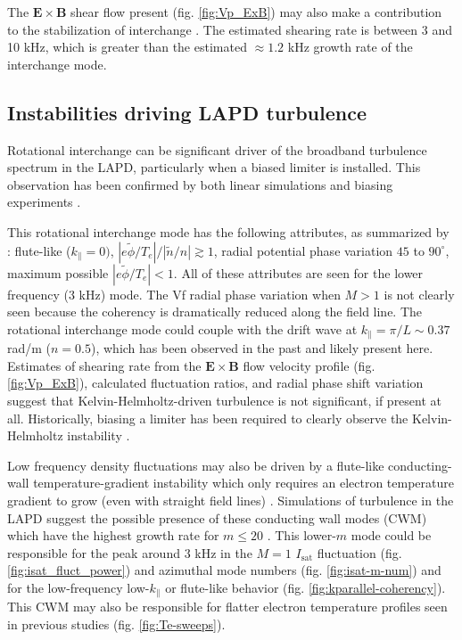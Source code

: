 The $\boldsymbol{E \times B}$ shear flow present (fig. \ref{fig:Vp_ExB}) may also make a contribution to the stabilization of interchange \cite{Ryutov_2011,Bagryansky_2003,Bagryansky_2007,Beklemishev_2010}. The estimated shearing rate is between 3 and 10 kHz, which is greater than the estimated $\approx 1.2$ kHz growth rate of the interchange mode.

\subsection{Instabilities driving LAPD turbulence}

Rotational interchange can be significant driver of the broadband turbulence spectrum in the LAPD, particularly when a biased limiter is installed. This observation has been confirmed by both linear simulations \cite{Popovich_2010} and biasing experiments \cite{Schaffner_2013}. 

This rotational interchange mode has the following attributes, as summarized by \cite{Jassby_transverse_1972}: flute-like ($k_\parallel=0)$, $|e\tilde{\phi}/T_e|/|\tilde{n}/n| \gtrsim 1$, radial potential phase variation $45$ to $90^\circ$, maximum possible $|e\tilde{\phi}/T_e| < 1$. All of these attributes are seen for the lower frequency (3 kHz) mode. The Vf radial phase variation when $M>1$ is not clearly seen because the coherency is dramatically reduced along the field line.
The rotational interchange mode could couple with the drift wave at $k_\parallel = \pi / L \sim 0.37$ rad/m ($n=0.5$), which has been observed in the past \cite{Schaffner_2013} and likely present here.
Estimates of shearing rate from the $\boldsymbol{E \times B}$ flow velocity profile (fig. \ref{fig:Vp_ExB}), calculated fluctuation ratios, and radial phase shift variation suggest that Kelvin-Helmholtz-driven turbulence is not significant, if present at all. Historically, biasing a limiter has been required to clearly observe the Kelvin-Helmholtz instability \cite{horton_vorticity_2005, Schaffner_2012, Schaffner_2013}.

Low frequency density fluctuations may also be driven by a flute-like conducting-wall temperature-gradient instability which only requires an electron temperature gradient to grow (even with straight field lines) \cite{Berk_1991}. Simulations of turbulence in the LAPD suggest the possible presence of these conducting wall modes (CWM) which have the highest growth rate for $m \leq 20$ \cite{Friedman_2013}. This lower-$m$ mode could be responsible for the peak around $3$ kHz in the $M=1$ $I_\text{sat}$ fluctuation (fig. \ref{fig:isat_fluct_power}) and azimuthal mode numbers (fig. \ref{fig:isat-m-num}) and for the low-frequency low-$k_\parallel$ or flute-like behavior (fig. \ref{fig:kparallel-coherency}). This CWM may also be responsible for flatter electron temperature profiles seen in previous studies \cite{Perks_impact_2022, Schaffner_2013} (fig. \ref{fig:Te-sweeps}). 

